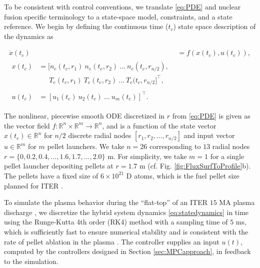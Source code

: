 \documentclass[journal,twoside,web]{ieeecolor}
\begin{document}
To be consistent with control conventions, we translate \eqref{eq:PDE} and nuclear fusion specific terminology to a state-space model, constraints, and a state reference. We begin by defining the continuous time ($t_c$) state space description of the dynamics as

\begin{subequations}
\begin{align}
     \dot{x}(t_c) &= f\left(x(t_c), u(t_c) \right), \label{eq:xdot} \\
    \begin{split}
    x(t_c) &= [n_e(t_c,r_1) ~ n_{e}(t_c,r_2) ~ \ldots ~n_e(t_c,r_{n/2}), \\ &\; \quad ~T_e(t_c,r_1) ~ T_e(t_c,r_2) ~\ldots~ T_e(t_c,r_{n/2}]^{\top}, \label{eq:x} 
    \end{split}\\
    \begin{split}
    u(t_c) &= [u_1(t_c) ~u_2(t_c) ~\ldots~ u_m(t_c)]^{\top}. \label{eq:u}  
    \end{split}
\end{align} \label{eq:statedynamics}  
\end{subequations}

\noindent The nonlinear, piecewise smooth ODE discretized in $r$ from \eqref{eq:PDE} is given as the vector field $f: \mathbb{R}^{n} \times \mathbb{R}^{m} \rightarrow \mathbb{R}^{n}$, and is a function of the state vector $x(t_c) \in \mathbb{R}^{n}$ for $n/2$ discrete radial nodes $[r_1, r_2, \ldots, r_{n/2}]$ and input vector $u \in \mathbb{R}^{m}$ for $m$ pellet launchers. We take $n = 26$ corresponding to $13$ radial nodes $r = \{0, 0.2, 0.4,...,1.6, 1.7,..., 2.0\}$ m. For simplicity, we take $m=1$ for a single pellet launcher depositing pellets at $r = 1.7$ m (cf. Fig. \ref{fig:FluxSurfToProfile}b). The pellets have a fixed size of $6\times 10^{21}$ D atoms, which is the fuel pellet size planned for ITER \cite{Baylor2016}. 

To simulate the plasma behavior during the \enquote{flat-top} of an ITER $15$ MA plasma discharge \cite{Garzotti2019}, we discretize the hybrid system dynamics \eqref{eq:statedynamics} in time using the Runge-Kutta 4th order (RK4) method with a sampling time of $5$ ms, which is sufficiently fast to ensure numerical stability and is consistent with the rate of pellet ablation in the plasma \cite{Franklin1997, Pegourie_2009}. The controller supplies an input $u(t)$, computed by the controllers designed in Section \ref{sec:MPCapproach}, in feedback to the simulation.
\end{document}
